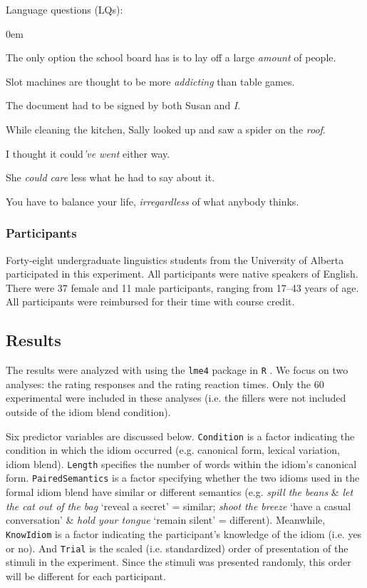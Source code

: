 \documentclass[output=paper
,modfonts
,nonflat]{langsci/langscibook}
\begin{document}
{\sc Language questions} (LQs):
\begin{enumerate}
\small{
\itemsep0em
\item The only option the school board has is to lay off a large \textit{amount} of people.
\item Slot machines are thought to be more \textit{addicting} than table games.
\item The document had to be signed by both Susan and \textit{I}.
\item While cleaning the kitchen, Sally looked up and saw a spider on the \textit{roof}.
\item I thought it could\textit{'ve went} either way.
\item She \textit{could care} less what he had to say about it.
\item You have to balance your life, \textit{irregardless} of what anybody thinks.
}
\end{enumerate}


\subsubsection{Participants}

Forty-eight undergraduate linguistics students from the University of Alberta participated in this experiment. All participants were native speakers of English. There were 37 female and 11 male participants, ranging from 17--43 years of age. All participants were reimbursed for their time with course credit.


\subsection{Results}

The results were analyzed with  using the \texttt{lme4} package \citep{BatesEtAl2015} in \texttt{R} \citep{R}. We focus on two analyses: the rating responses and the rating reaction times. Only the 60 experimental  were included in these analyses (i.e. the fillers were not included outside of the idiom blend condition). %

Six predictor variables are discussed below. \texttt{Condition} is a factor indicating the condition in which the idiom occurred (e.g. canonical form, lexical variation, idiom blend). \texttt{Length} specifies the number of words within the idiom's canonical form. \texttt{PairedSemantics} is a factor specifying whether the two idioms used in the formal idiom blend have similar or different semantics (e.g. \textit{spill the beans} \& \textit{let the cat out of the bag} `reveal a secret' = similar; \textit{shoot the breeze} `have a casual conversation' \& \textit{hold your tongue} `remain silent' = different). Meanwhile, \texttt{KnowIdiom} is a factor indicating the participant's knowledge of the idiom (i.e. yes or no). And \texttt{Trial} is the scaled (i.e. standardized) order of presentation of the stimuli in the experiment. Since the stimuli was presented randomly, this order will be different for each participant. 
\end{document}
